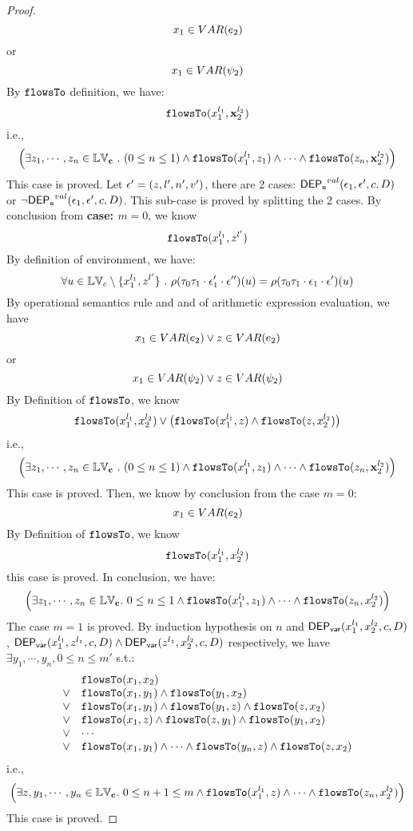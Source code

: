 \begin{proof}
\[
  x_1 \in VAR(e_2) 
\]
or
\[
  x_1 \in VAR(\psi_2)
\]
%
By $\mathtt{flowsTo}$ definition, we have:
%
\[
\mathtt{flowsTo}(x_1^{l_1}, {\boldsymbol{\mathbf{x}}}_2^{l_2})
\]
i.e.,
%
\[
 \Big( \exists z_1, \cdots, z_n \in \mathbb{LV}_{{\boldsymbol{\mathbf{c}}}} ~.~ (0 \leq n \leq 1 )
 \land \mathtt{flowsTo}(x_1^{l_1}, z_1) \land \cdots \land \mathtt{flowsTo}(z_n, {\boldsymbol{\mathbf{x}}}_2^{l_2}) \Big)
\]
%
This case is proved.
%
%
Let $\mathtt{\epsilon}' = (z, l', n', v')$, there are 2 cases:
%
$\mathsf{DEP_{\mathtt{e}}}^{val}(\mathtt{\epsilon}_1, \mathtt{\epsilon}', c, D)$ or $\neg \mathsf{DEP_{\mathtt{e}}}^{val}(\mathtt{\epsilon}_1, \mathtt{\epsilon}', c, D)$.
%
This sub-case is proved by splitting the 2 cases.
%
%
By conclusion from \textbf{case: $m = 0$}, we know
\[
  \mathtt{flowsTo}(x_1^{l_1}, z^{l'})
\]
%
By definition of environment, we have:
\[
  \forall u \in \mathbb{LV}_c \setminus \{x_1^{l_1}, z^{l'}\} ~.~
  \rho(\mathtt{\tau}_0 \mathtt{\tau}_1 \cdot \mathtt{\epsilon}_1' \cdot \mathtt{\epsilon}'') (u) =  
  \rho(\mathtt{\tau}_0 \mathtt{\tau}_1 \cdot \mathtt{\epsilon}_1 \cdot \mathtt{\epsilon}') (u)
\]
By operational semantics rule  and  and  of arithmetic expression evaluation, we have 
\[
  x_1 \in VAR(e_2) \lor z \in VAR(e_2)
\]
or
\[
  x_1 \in VAR(\psi_2) \lor z \in VAR(\psi_2)
\]
%
By Definition of $\mathtt{flowsTo}$, we know
\[
  \mathtt{flowsTo}(x_1^{l_1}, x_2^{l_2}) \lor 
  \big(\mathtt{flowsTo}(x_1^{l_1}, z) \land \mathtt{flowsTo}(z, x_2^{l_2}) \big)
\]
%
i.e.,
%
\[
 \Big( \exists z_1, \cdots, z_n \in \mathbb{LV}_{{\boldsymbol{\mathbf{c}}}} ~.~ (0 \leq n \leq 1 )
 \land \mathtt{flowsTo}(x_1^{l_1}, z_1) \land \cdots \land \mathtt{flowsTo}(z_n, {\boldsymbol{\mathbf{x}}}_2^{l_2}) \Big)
\]
%
This case is proved.
%
Then, we know by conclusion from the case $m = 0$:
\[
  x_1 \in VAR(e_2)
\]
%
By Definition of $\mathtt{flowsTo}$, we know
\[
  \mathtt{flowsTo}(x_1^{l_1}, x_2^{l_2}) 
\]
this case is proved.
%
In conclusion, we have:
\[
  \Big( \exists z_1, \cdots, z_n \in \mathbb{LV}_{{\boldsymbol{\mathbf{c}}}}. ~ 0 \leq n \leq 1 \land
  \mathtt{flowsTo}(x_1^{l_1}, z_1) 
  \land \cdots \land \mathtt{flowsTo}(z_n, x_2^{l_2}) \Big)
\]
The case $m = 1$ is proved.
%
By induction hypothesis on $n$ and $\mathsf{DEP_{var}}(x_1^{l_1}, x_2^{l_2}, c, D)$, 
$\mathsf{DEP_{var}}(x_1^{l_1}, z^{l_z}, c, D) \land \mathsf{DEP_{var}}(z^{l_z}, x_2^{l_2}, c, D)$ respectively, 
we have $\exists y_1, \cdots, y_n, 0 \leq n \leq m'$ s.t.:
\[
\begin{array}{ll}
      & \mathtt{flowsTo}(x_1, x_2) \\
  \lor  & \mathtt{flowsTo}(x_1, y_1) \land \mathtt{flowsTo}(y_1, x_2)\\
  \lor  & \mathtt{flowsTo}(x_1, y_1) \land \mathtt{flowsTo}(y_1, z) \land \mathtt{flowsTo}(z, x_2) \\
  \lor  & \mathtt{flowsTo}(x_1, z) \land \mathtt{flowsTo}(z, y_1) \land \mathtt{flowsTo}(y_1, x_2) \\
  \lor  & \cdots \\
  \lor  & \mathtt{flowsTo}(x_1, y_1) \land \cdots \land \mathtt{flowsTo}(y_n, z) \land \mathtt{flowsTo}(z, x_2) \\
\end{array}
\]
i.e.,
\[
  \Big( \exists z, y_1, \cdots, y_n \in \mathbb{LV}_{{\boldsymbol{\mathbf{c}}}}. ~ 0 \leq n + 1 \leq m \land
  \mathtt{flowsTo}(x_1^{l_1}, z) 
  \land \cdots \land \mathtt{flowsTo}(z_n, x_2^{l_2}) \Big)
\]
This case is proved.


\end{proof}
